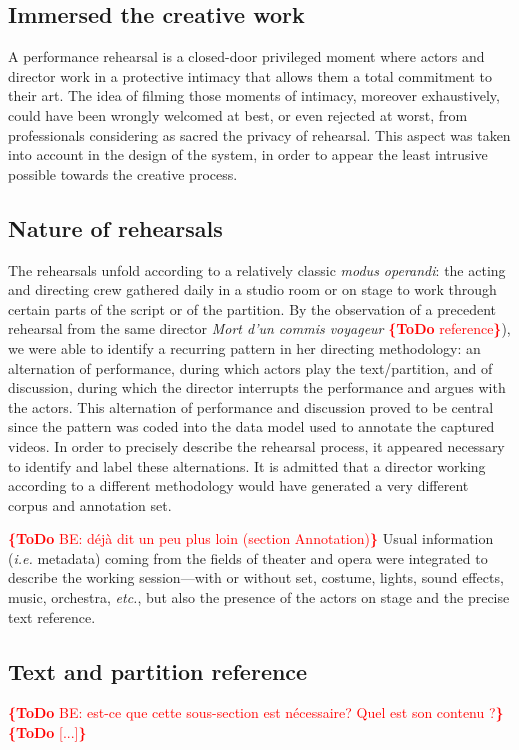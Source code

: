 \documentclass[conference]{IEEEtran}
\newcommand{\todo}[1]{\noindent\textcolor{red}{{\bf \{ToDo} #1{\bf \}}}}
\begin{document}
\subsection{Immersed the creative work}

A performance rehearsal is a closed-door privileged moment where actors and director work in a protective intimacy that allows them a total commitment to their art. The idea of filming those moments of intimacy, moreover exhaustively, could have been wrongly welcomed at best, or even rejected at worst, from professionals considering as sacred the privacy of rehearsal.
This aspect was taken into account in the design of the system, in order to appear the least intrusive possible towards the creative process.

\subsection{Nature of rehearsals}

The rehearsals unfold according to a relatively classic \emph{modus operandi}: the acting and directing crew gathered daily in a studio room or on stage to work through certain parts of the script or of the partition. By the observation of a precedent rehearsal from the same director \emph{Mort d'un commis voyageur} \todo{reference}), we were able to identify a recurring pattern in her directing methodology: an alternation of performance, during which actors play the text/partition, and of discussion, during which the director interrupts the performance and argues with the actors. This alternation of performance and discussion proved to be central since the pattern was coded into the data model used to annotate the captured videos.
In order to precisely describe the rehearsal process, it appeared necessary to identify and label these alternations.
It is admitted that a director working according to a different methodology would have generated a very different corpus and annotation set.

\todo{BE: déjà dit un peu plus loin (section Annotation)}
Usual information (\emph{i.e.} metadata) coming from the fields of theater and opera were integrated to describe the working session---with or without set, costume, lights, sound effects, music, orchestra, \emph{etc.}, but also the presence of the actors on stage and the precise text reference.

\subsection{Text and partition reference}
\todo{BE: est-ce que cette sous-section est nécessaire? Quel est son contenu ?}
\todo{[...]}
\end{document}
